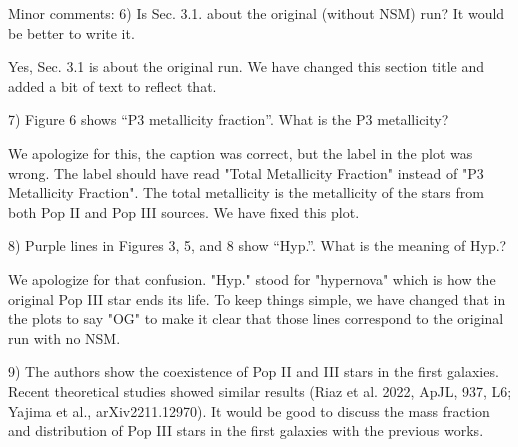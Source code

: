 \documentclass[11pt]{article}
\begin{document}
\begin{tcolorbox}[colback={lightgray}]
    Minor comments:
    6)      Is Sec. 3.1. about the original (without NSM) run? It would be better to write it.
\end{tcolorbox}

Yes, Sec. 3.1 is about the original run. We have changed this section title and added a bit of text to reflect that.

\begin{tcolorbox}[colback={lightgray}]
    7)      Figure 6 shows “P3 metallicity fraction”. What is the P3 metallicity?
\end{tcolorbox}

We apologize for this, the caption was correct, but the label in the plot was wrong. The label should have read "Total Metallicity Fraction" instead of "P3 Metallicity Fraction". The total metallicity is the metallicity of the stars from both Pop II and Pop III sources. We have fixed this plot.

\begin{tcolorbox}[colback={lightgray}]
    8)      Purple lines in Figures 3, 5, and 8 show “Hyp.”. What is the meaning of Hyp.?
\end{tcolorbox}

We apologize for that confusion. "Hyp." stood for "hypernova" which is how the original Pop III star ends its life. To keep things simple, we have changed that in the plots to say "OG" to make it clear that those lines correspond to the original run with no NSM. 

\begin{tcolorbox}[colback={lightgray}]
    9)      The authors show the coexistence of Pop II and III stars in the first galaxies. Recent theoretical studies showed similar results (Riaz et al. 2022, ApJL, 937, L6; Yajima et al., arXiv2211.12970). It would be good to discuss the mass fraction and distribution of Pop III stars in the first galaxies with the previous works. 
\end{tcolorbox}
\end{document}
